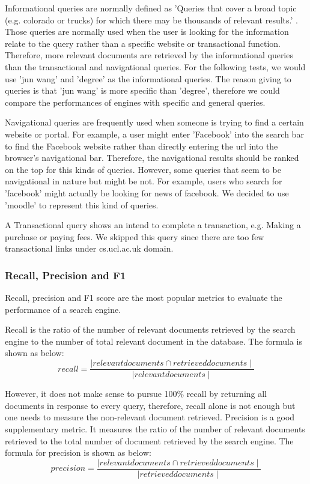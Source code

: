 Informational queries are normally defined as 'Queries that cover a broad topic (e.g. colorado or trucks) for which there may be thousands of relevant results.' \cite{queries}. Those queries are normally used when  the user is looking for the information relate to the query rather than a specific website or transactional function. Therefore, more relevant documents are retrieved by the informational queries than the transactional and navigational queries. For the following tests, we would use 'jun wang' and 'degree' as the informational queries. The reason giving to queries is that 'jun wang' is more specific than 'degree', therefore we could compare the performances of engines with specific and general queries.

Navigational queries are frequently used when someone is trying to find a certain website or portal. For example, a user might enter 'Facebook' into the search bar to find the Facebook website rather than directly entering the url into the browser's navigational bar. Therefore, the navigational results should be ranked on the top for this kinds of queries. However, some queries that seem to be navigational in nature but might be not. For example, users who search for 'facebook' might actually be looking for news of facebook. We decided to use 'moodle' to represent this kind of queries.

A Transactional query shows an intend to complete a transaction, e.g. Making a purchase or paying fees. We skipped this query since there are too few transactional links under cs.ucl.ac.uk domain. 

\subsubsection{Recall, Precision and F1}
Recall, precision and F1 score are the most popular metrics to evaluate the performance of a search engine. 

Recall is the ratio of the number of relevant documents retrieved by the search engine to the number of total relevant document in the database. The formula is shown as below: 
\[recall=\frac{\mid relevant documents\cap retrieved documents\mid}{\mid relevant documents \mid}\]

However, it does not make sense to pursue 100\% recall by returning all documents in response to every query, therefore, recall alone is not enough but one needs to measure the non-relevant document retrieved. Precision is a good supplementary metric. It measures the ratio of the number of relevant  documents retrieved to the total number of document retrieved by the search engine. The formula for precision is shown as below:
\[precision=\frac{\mid relevant documents\cap retrieved documents\mid}{\mid retrieved documents \mid}\]

